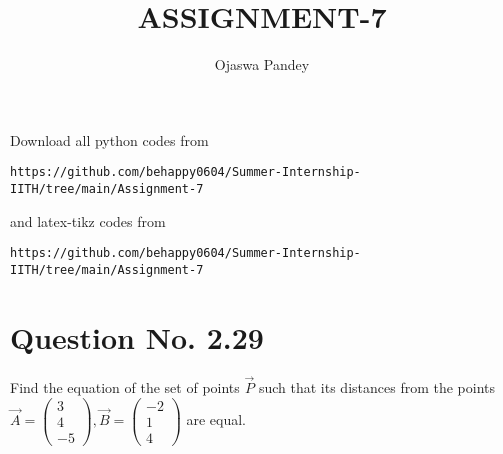\documentclass[journal,12pt,twocolumn]{IEEEtran}
\newcommand{\myvec}[1]{\ensuremath{\begin{pmatrix}#1\end{pmatrix}}}
\begin{document}
     \def\topbox#1{\raisebox{-\baselineskip}[0in][0in]{#1}}
     \def\midbox#1{\raisebox{-0.5\baselineskip}[0in][0in]{#1}}
\vspace{3cm}
\title{ASSIGNMENT-7}
\author{Ojaswa Pandey}
\maketitle
\newpage
\bigskip
\renewcommand{\thefigure}{\theenumi}
\renewcommand{\thetable}{\theenumi}
Download all python codes from 
\begin{lstlisting}
https://github.com/behappy0604/Summer-Internship-IITH/tree/main/Assignment-7
\end{lstlisting}
%
and latex-tikz codes from 
%
\begin{lstlisting}
https://github.com/behappy0604/Summer-Internship-IITH/tree/main/Assignment-7
\end{lstlisting}
%
\section{Question No. 2.29} 
 Find the equation of the set of points $\vec{P}$ such that its distances from the points
$
\vec{A}=\myvec{3\\4\\-5}, 
\vec{B}=\myvec{-2\\1\\4}
$
are equal. 
\end{document}
